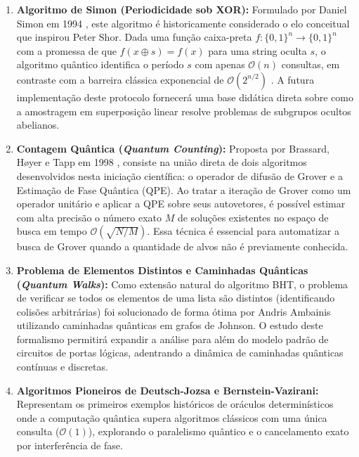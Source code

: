 \documentclass[12pt, a4paper]{article}
\begin{document}
\begin{enumerate}[label=\textbf{\arabic*.}]
    \item \textbf{Algoritmo de Simon (Periodicidade sob XOR):} Formulado por Daniel Simon em 1994 \cite{simon1997power}, este algoritmo é historicamente considerado o elo conceitual que inspirou Peter Shor. Dada uma função caixa-preta $f: \{0,1\}^n \to \{0,1\}^n$ com a promessa de que $f(x \oplus s) = f(x)$ para uma string oculta $s$, o algoritmo quântico identifica o período $s$ com apenas $\mathcal{O}(n)$ consultas, em contraste com a barreira clássica exponencial de $\mathcal{O}(2^{n/2})$ \cite{nielsen2010}. A futura implementação deste protocolo fornecerá uma base didática direta sobre como a amostragem em superposição linear resolve problemas de subgrupos ocultos abelianos.
    
    \item \textbf{Contagem Quântica (\textit{Quantum Counting}):} Proposta por Brassard, H{\o}yer e Tapp em 1998 \cite{brassard2002quantum}, consiste na união direta de dois algoritmos desenvolvidos nesta iniciação científica: o operador de difusão de Grover e a Estimação de Fase Quântica (QPE). Ao tratar a iteração de Grover como um operador unitário e aplicar a QPE sobre seus autovetores, é possível estimar com alta precisão o número exato $M$ de soluções existentes no espaço de busca em tempo $\mathcal{O}(\sqrt{N/M})$. Essa técnica é essencial para automatizar a busca de Grover quando a quantidade de alvos não é previamente conhecida.
    
    \item \textbf{Problema de Elementos Distintos e Caminhadas Quânticas (\textit{Quantum Walks}):} Como extensão natural do algoritmo BHT, o problema de verificar se todos os elementos de uma lista são distintos (identificando colisões arbitrárias) foi solucionado de forma ótima por Andris Ambainis utilizando caminhadas quânticas em grafos de Johnson. O estudo deste formalismo permitirá expandir a análise para além do modelo padrão de circuitos de portas lógicas, adentrando a dinâmica de caminhadas quânticas contínuas e discretas.
    
    \item \textbf{Algoritmos Pioneiros de Deutsch-Jozsa e Bernstein-Vazirani:} Representam os primeiros exemplos históricos de oráculos determinísticos onde a computação quântica supera algoritmos clássicos com uma única consulta ($\mathcal{O}(1)$), explorando o paralelismo quântico e o cancelamento exato por interferência de fase.
\end{enumerate}
\end{document}

